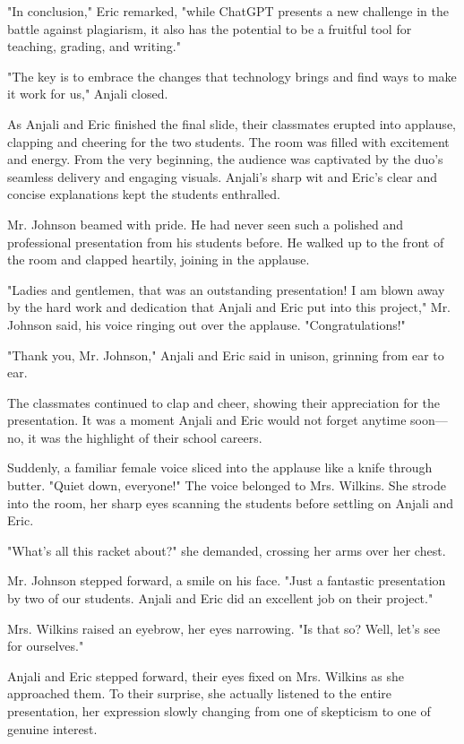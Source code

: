 \documentclass[stu]{apa7}
\begin{document}
"In conclusion," Eric remarked, "while ChatGPT presents a new challenge in the battle against plagiarism, it also has the potential to be a fruitful tool for teaching, grading, and writing."

"The key is to embrace the changes that technology brings and find ways to make it work for us," Anjali closed.

As Anjali and Eric finished the final slide, their classmates erupted into applause, clapping and cheering for the two students. The room was filled with excitement and energy. From the very beginning, the audience was captivated by the duo's seamless delivery and engaging visuals. Anjali's sharp wit and Eric's clear and concise explanations kept the students enthralled.

Mr. Johnson beamed with pride. He had never seen such a polished and professional presentation from his students before. He walked up to the front of the room and clapped heartily, joining in the applause.

"Ladies and gentlemen, that was an outstanding presentation! I am blown away by the hard work and dedication that Anjali and Eric put into this project," Mr. Johnson said, his voice ringing out over the applause. "Congratulations!"

"Thank you, Mr. Johnson," Anjali and Eric said in unison, grinning from ear to ear.

The classmates continued to clap and cheer, showing their appreciation for the presentation. It was a moment Anjali and Eric would not forget anytime soon---no, it was the highlight of their school careers.

Suddenly, a familiar female voice sliced into the applause like a knife through butter. "Quiet down, everyone!" The voice belonged to Mrs. Wilkins. She strode into the room, her sharp eyes scanning the students before settling on Anjali and Eric.

"What's all this racket about?" she demanded, crossing her arms over her chest.

Mr. Johnson stepped forward, a smile on his face. "Just a fantastic presentation by two of our students. Anjali and Eric did an excellent job on their project."

Mrs. Wilkins raised an eyebrow, her eyes narrowing. "Is that so? Well, let's see for ourselves."

Anjali and Eric stepped forward, their eyes fixed on Mrs. Wilkins as she approached them. To their surprise, she actually listened to the entire presentation, her expression slowly changing from one of skepticism to one of genuine interest.
\end{document}
